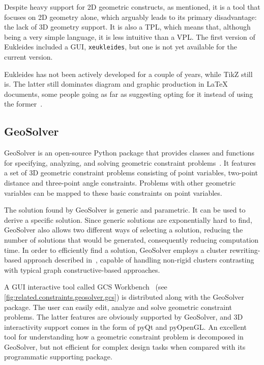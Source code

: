 Despite heavy support for 2D geometric constructs, as mentioned, it is a tool
that focuses on 2D geometry alone, which arguably leads to its primary
disadvantage: the lack of 3D geometry support.  It is also a \ac{TPL}, which
means that, although being a very simple language, it is less intuitive than a
\ac{VPL}.  The first version of Eukleides included a \ac{GUI},
\texttt{xeukleides}, but one is not yet available for the current version.

Eukleides has not been actively developed for a couple of years, while
\acs{TikZ} still is.  The latter still dominates diagram and graphic production
in \LaTeX{} documents, some people going as far as suggesting opting for it
instead of using the former~\cite{Christian:2014:TEXE:Eukleides}.

\subsection{GeoSolver}%
\label{sec:related.constraints.geosolver}

GeoSolver is an open-source Python package that provides classes and functions
for specifying, analyzing, and solving geometric constraint
problems~\cite{Van:2009:GeoSolver}.  It features a set of 3D geometric
constraint problems consisting of point variables, two-point distance and
three-point angle constraints.  Problems with other geometric variables can be
mapped to these basic constraints on point variables.

The solution found by GeoSolver is generic and parametric.  It can be used to
derive a specific solution.  Since generic solutions are exponentially hard to
find, GeoSolver also allows two different ways of selecting a solution, reducing
the number of solutions that would be generated, consequently reducing
computation time.  In order to efficiently find a solution, GeoSolver employs a
cluster rewriting-based approach described in~\cite{Van:2009:NRCRASSGC}, capable
of handling non-rigid clusters contrasting with typical graph constructive-based
approaches.

A \ac{GUI} interactive tool called \ac{GCS} Workbench~\cite{DeRegt:2008:WGCS}
(see \cref{fig:related.constraints.geosolver.gcs}) is distributed along with the
GeoSolver package.  The user can easily edit, analyze and solve geometric
constraint problems.  The latter features are obviously supported by GeoSolver,
and 3D interactivity support comes in the form of pyQt and pyOpenGL\@.  An
excellent tool for understanding how a geometric constraint problem is
decomposed in GeoSolver, but not efficient for complex design tasks when
compared with its programmatic supporting package.

